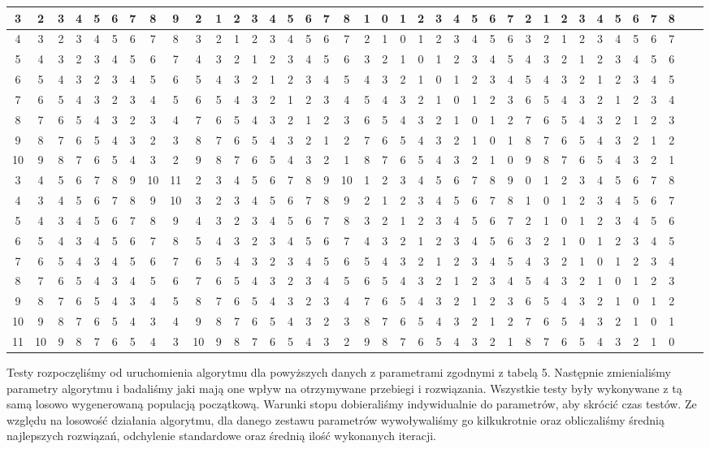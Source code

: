 \documentclass[12pt]{article}
\begin{document}
\begin{table}[H]
\begin{center}
{\begin{tabular}{| c | c | c | c | c | c | c | c | c | c | c | c | c | c | c | c | c | c | c | c | c | c | c | c | c | c | c | c | c | c | c | c | c | c | c | c | c | c |}
3&2&3&4&5&6&7&8&9&2&1&2&3&4&5&6&7&8&1&0&1&2&3&4&5&6&7&2&1&2&3&4&5&6&7&8\\ \hline
4&3&2&3&4&5&6&7&8&3&2&1&2&3&4&5&6&7&2&1&0&1&2&3&4&5&6&3&2&1&2&3&4&5&6&7\\ \hline
5&4&3&2&3&4&5&6&7&4&3&2&1&2&3&4&5&6&3&2&1&0&1&2&3&4&5&4&3&2&1&2&3&4&5&6\\ \hline
6&5&4&3&2&3&4&5&6&5&4&3&2&1&2&3&4&5&4&3&2&1&0&1&2&3&4&5&4&3&2&1&2&3&4&5\\ \hline
7&6&5&4&3&2&3&4&5&6&5&4&3&2&1&2&3&4&5&4&3&2&1&0&1&2&3&6&5&4&3&2&1&2&3&4\\ \hline
8&7&6&5&4&3&2&3&4&7&6&5&4&3&2&1&2&3&6&5&4&3&2&1&0&1&2&7&6&5&4&3&2&1&2&3\\ \hline
9&8&7&6&5&4&3&2&3&8&7&6&5&4&3&2&1&2&7&6&5&4&3&2&1&0&1&8&7&6&5&4&3&2&1&2\\ \hline
10&9&8&7&6&5&4&3&2&9&8&7&6&5&4&3&2&1&8&7&6&5&4&3&2&1&0&9&8&7&6&5&4&3&2&1\\ \hline
3&4&5&6&7&8&9&10&11&2&3&4&5&6&7&8&9&10&1&2&3&4&5&6&7&8&9&0&1&2&3&4&5&6&7&8\\ \hline
4&3&4&5&6&7&8&9&10&3&2&3&4&5&6&7&8&9&2&1&2&3&4&5&6&7&8&1&0&1&2&3&4&5&6&7\\ \hline
5&4&3&4&5&6&7&8&9&4&3&2&3&4&5&6&7&8&3&2&1&2&3&4&5&6&7&2&1&0&1&2&3&4&5&6\\ \hline
6&5&4&3&4&5&6&7&8&5&4&3&2&3&4&5&6&7&4&3&2&1&2&3&4&5&6&3&2&1&0&1&2&3&4&5\\ \hline
7&6&5&4&3&4&5&6&7&6&5&4&3&2&3&4&5&6&5&4&3&2&1&2&3&4&5&4&3&2&1&0&1&2&3&4\\ \hline
8&7&6&5&4&3&4&5&6&7&6&5&4&3&2&3&4&5&6&5&4&3&2&1&2&3&4&5&4&3&2&1&0&1&2&3\\ \hline
9&8&7&6&5&4&3&4&5&8&7&6&5&4&3&2&3&4&7&6&5&4&3&2&1&2&3&6&5&4&3&2&1&0&1&2\\ \hline
10&9&8&7&6&5&4&3&4&9&8&7&6&5&4&3&2&3&8&7&6&5&4&3&2&1&2&7&6&5&4&3&2&1&0&1\\ \hline
11&10&9&8&7&6&5&4&3&10&9&8&7&6&5&4&3&2&9&8&7&6&5&4&3&2&1&8&7&6&5&4&3&2&1&0\\ \hline
	\end{tabular}}
\end{center}
\end{table}
\par
Testy rozpoczęliśmy od uruchomienia algorytmu dla powyższych danych z parametrami zgodnymi z tabelą 5. Następnie zmienialiśmy parametry algorytmu i badaliśmy jaki mają one wpływ na otrzymywane przebiegi i rozwiązania. Wszystkie testy były wykonywane z tą samą losowo wygenerowaną populacją początkową. Warunki stopu dobieraliśmy indywidualnie do parametrów, aby skrócić czas testów. Ze względu na losowość działania algorytmu, dla danego zestawu parametrów wywoływaliśmy go kilkukrotnie oraz obliczaliśmy średnią najlepszych rozwiązań, odchylenie standardowe oraz średnią ilość wykonanych iteracji.
\end{document}
